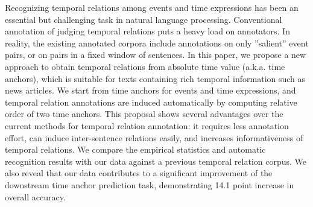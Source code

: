 Recognizing temporal relations among events and time expressions has been an essential but challenging task in natural language processing. Conventional annotation of judging temporal relations puts a heavy load on annotators. In reality, the existing annotated corpora include annotations on only ''salient'' event pairs, or on pairs in a fixed window of sentences. In this paper, we propose a new approach to obtain temporal relations from absolute time value (a.k.a. time anchors), which is suitable for texts containing rich temporal information such as news articles. We start from time anchors for events and time expressions, and temporal relation annotations are induced automatically by computing relative order of two time anchors. This proposal shows several advantages over the current methods for temporal relation annotation: it requires less annotation effort, can induce inter-sentence relations easily, and increases informativeness of temporal relations. We compare the empirical statistics and automatic recognition results with our data against a previous temporal relation corpus. We also reveal that our data contributes to a significant improvement of the downstream time anchor prediction task, demonstrating 14.1 point increase in overall accuracy.
